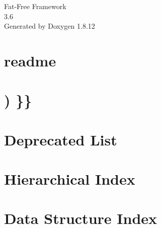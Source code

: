 \documentclass[twoside]{book}
\newcommand{\+}{\discretionary{\mbox{\scriptsize$\hookleftarrow$}}{}{}}
\newcommand{\clearemptydoublepage}{%
  \newpage{\pagestyle{empty}\cleardoublepage}%
}
\begin{document}
\hypersetup{pageanchor=false,
             bookmarksnumbered=true,
             pdfencoding=unicode
            }
\begin{titlepage}
\vspace*{7cm}
\begin{center}%
{\Large Fat-\/\+Free Framework \\[1ex]\large 3.\+6 }\\
\vspace*{1cm}
{\large Generated by Doxygen 1.8.12}\\
\end{center}
\end{titlepage}
\clearemptydoublepage
{}
\tableofcontents
\clearemptydoublepage
{}
\hypersetup{pageanchor=true}

\chapter{readme}
\label{md___users_aplennevaux__g_i_t_h_u_b__visionary-website_src_vendor_bcosca_fatfree_readme}
\hypertarget{md___users_aplennevaux__g_i_t_h_u_b__visionary-website_src_vendor_bcosca_fatfree_readme}{}

\chapter{) \}\}}
\label{-1}
\hypertarget{-1}{}

\chapter{Deprecated List}
\label{deprecated}
\hypertarget{deprecated}{}

\chapter{Hierarchical Index}

\chapter{Data Structure Index}

\end{document}
